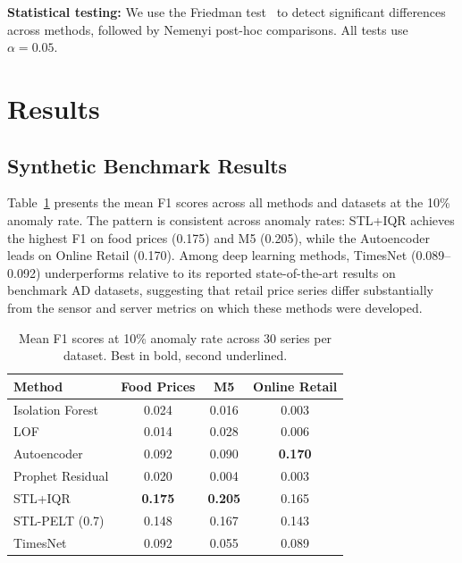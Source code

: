 \documentclass[10pt]{article}
\begin{document}
\noindent\textbf{Statistical testing:} We use the Friedman test~\cite{darban2022survey} to detect significant differences across methods, followed by Nemenyi post-hoc comparisons. All tests use $\alpha=0.05$.

\section{Results}
\label{sec:results}

\subsection{Synthetic Benchmark Results}

Table~\ref{tab:synthetic} presents the mean F1 scores across all methods and datasets at the 10\% anomaly rate. The pattern is consistent across anomaly rates: STL+IQR achieves the highest F1 on food prices (0.175) and M5 (0.205), while the Autoencoder leads on Online Retail (0.170). Among deep learning methods, TimesNet (0.089--0.092) underperforms relative to its reported state-of-the-art results on benchmark AD datasets, suggesting that retail price series differ substantially from the sensor and server metrics on which these methods were developed.

\begin{table}[h]
\centering
\caption{Mean F1 scores at 10\% anomaly rate across 30 series per dataset. Best in bold, second underlined.}
\label{tab:synthetic}
\small
\begin{tabular}{lccc}
\toprule
Method & Food Prices & M5 & Online Retail \\
\midrule
Isolation Forest  & 0.024 & 0.016 & 0.003 \\
LOF               & 0.014 & 0.028 & 0.006 \\
Autoencoder       & 0.092 & 0.090 & \textbf{0.170} \\
Prophet Residual  & 0.020 & 0.004 & 0.003 \\
STL+IQR           & \textbf{0.175} & \textbf{0.205} & 0.165 \\
STL-PELT (0.7)    & 0.148 & 0.167 & 0.143 \\
TimesNet          & 0.092 & 0.055 & 0.089 \\
\bottomrule
\end{tabular}
\end{table}
\end{document}
